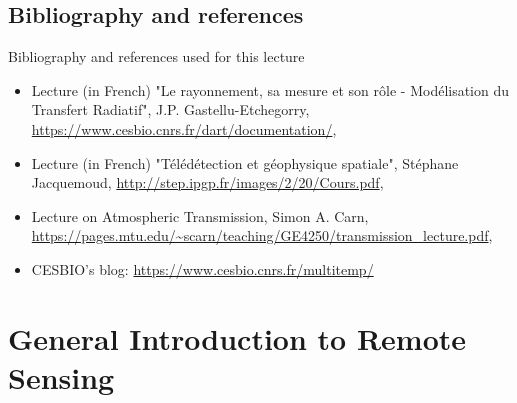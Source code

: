 \documentclass[aspectratio=169, 9pt]{beamer}
\begin{document}
\subsection{Bibliography and references}
\begin{frame}{Bibliography and references used for this lecture}

\begin{itemize}[label=$\bullet$]
	\item Lecture (in French) "Le rayonnement, sa mesure et son rôle - Modélisation du Transfert Radiatif", J.P. Gastellu-Etchegorry, \url{https://www.cesbio.cnrs.fr/dart/documentation/},
	\item Lecture (in French) "Télédétection et géophysique spatiale", Stéphane Jacquemoud, \url{http://step.ipgp.fr/images/2/20/Cours.pdf},
	\item Lecture on Atmospheric Transmission, Simon A. Carn, \url{https://pages.mtu.edu/~scarn/teaching/GE4250/transmission_lecture.pdf},
	\item CESBIO's blog: \url{https://www.cesbio.cnrs.fr/multitemp/}
\end{itemize}

\end{frame}
\section{General Introduction to Remote Sensing}
\end{document}
